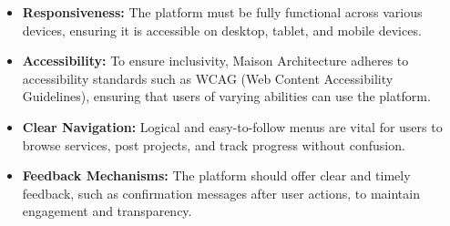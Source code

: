 \begin{itemize}
    \item \textbf{Responsiveness:} The platform must be fully functional across various devices, ensuring it is accessible on desktop, tablet, and mobile devices.

    \item \textbf{Accessibility:} To ensure inclusivity, Maison Architecture adheres to accessibility standards such as WCAG (Web Content Accessibility Guidelines), ensuring that users of varying abilities can use the platform.

    \item \textbf{Clear Navigation:} Logical and easy-to-follow menus are vital for users to browse services, post projects, and track progress without confusion.

    \item \textbf{Feedback Mechanisms:} The platform should offer clear and timely feedback, such as confirmation messages after user actions, to maintain engagement and transparency.
\end{itemize}


